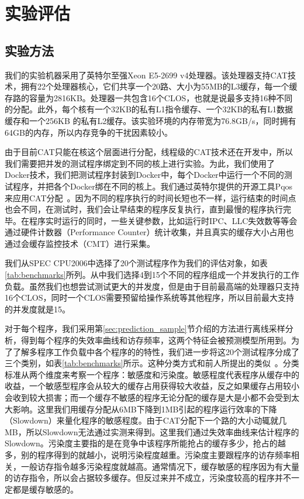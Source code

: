 
\chapter{实验评估} \label{chap:evaluation}

\section{实验方法}

我们的实验机器采用了英特尔至强Xeon E5-2699 v4处理器。该处理器支持CAT技术，拥有22个处理器核心，它们共享一个20路、大小为55MB的L3缓存，每一个缓存路的容量为2816KB。处理器一共包含16个CLOS，也就是说最多支持16种不同的分配。此外，每个核有一个32KB的私有L1指令缓存、一个32KB的私有L1数据缓存和一个256KB 的私有L2缓存。该实验环境的内存带宽为76.8GB/s，同时拥有64GB的内存，所以内存竞争的干扰因素较小。

由于目前CAT只能在核这个层面进行分配，线程级的CAT技术还在开发中，所以我们需要把并发的测试程序绑定到不同的核上进行实验。为此，我们使用了Docker技术，我们把测试程序封装到Docker中，每个Docker中运行一个不同的测试程序，并把各个Docker绑在不同的核上。我们通过英特尔提供的开源工具Pqos来应用CAT分配~\parencite{pqos}。因为不同的程序执行的时间长短也不一样，运行结束的时间点也会不同，在测试时，我们会让早结束的程序反复执行，直到最慢的程序执行完毕。在程序实时运行的同时，一些关键参数，比如运行时IPC、LLC失效数等等会通过硬件计数器（Performance Counter）统计收集，并且真实的缓存大小占用也通过会缓存监控技术（CMT）进行采集。

我们从SPEC CPU2006中选择了20个测试程序作为我们的评估对象，如表\ref{tab:benchmarks}所列。从中我们选择4到15个不同的程序组成一个并发执行的工作负载。虽然我们也想尝试测试更大的并发度，但是由于目前最高端的处理器只支持16个CLOS，同时一个CLOS需要预留给操作系统等其他程序，所以目前最大支持的并发度就是15。

对于每个程序，我们采用第\ref{sec:prediction_sample}节介绍的方法进行离线采样分析，得到每个程序的失效率曲线和访存频率，这两个特征会被预测模型所用到。为了了解多程序工作负载中各个程序的的特性，我们进一步将这20个测试程序分成了三个类别，如表\ref{tab:benchmarks}所示。这种分类方式和前人所提出的类似~\parencite{lin2008gaining}。分类标准从两个维度来考察一个程序：敏感度和污染度。敏感程度代表程序从缓存中的收益，一个敏感型程序会从较大的缓存占用获得较大收益，反之如果缓存占用较小会收到较大损害；而一个缓存不敏感的程序无论分配的缓存是大是小都不会受到太大影响。这里我们用缓存分配从6MB下降到1MB引起的程序运行效率的下降（Slowdown）来量化程序的敏感程度。由于CAT分配下一个路的大小动辄就几MB，所以Slowdown无法通过实测来得到。这里我们通过失效率曲线来估计程序的Slowdown。污染度主要指的是在竞争中该程序所能抢占的缓存多少，抢占的越多，别的程序得到的就越小，说明污染程度越重。污染度主要跟程序的访存频率相关，一般访存指令越多污染程度就越高。通常情况下，缓存敏感的程序因为有大量的访存指令，所以会占据较多缓存。但反过来并不成立，污染度较高的程序并不一定都是缓存敏感的。

